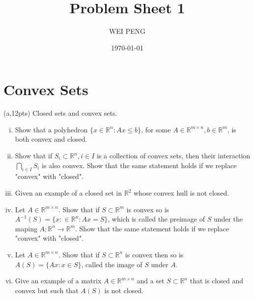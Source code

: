 \documentclass{article}     %
\title{Problem Sheet 1}  %
\author{WEI PENG}      %
\date{\today}      %
\begin{document}
\maketitle    

\section{Convex Sets}
(a,12pts) Closed sets and convex sets.
\begin{enumerate}[i.]
    \item Show that a polyhedron $\{x\in \mathbb{R}^n: Ax\leq b\}$, for some $A\in \mathbb{R}^{m\times n},b\in \mathbb{R}^m$, is both convex and closed.
    \item Show that if $S_i\subset \mathbb{R}^n,i\in I$ is a collection of convex sets, then their interaction $\bigcap_{i\in I}S_i$ is also convex. Show that the same statement holds if we replace "convex" with "closed".
    \item Given an example of a closed set in $\mathbb{R}^2$ whose convex hull is not closed.
    \item Let $A\in \mathbb{R}^{m\times n}$. Show that if $S\subset \mathbb{R}^m$ is convex so is $A^{-1}(S)=\{x:\in \mathbb{R}^{n}: Ax=S\}$, which is called the preimage of $S$ under the maping $A;\mathbb{R}^{n}\rightarrow \mathbb{R}^{m}$. Show that the same statement holds if we replace "convex" with "closed".
    \item Let $A\in \mathbb{R}^{m\times n}$. Show that if $S\subset \mathbb{R}^{n}$ is convex then so is $A(S)=\{Ax:x\in S\}$, called the image of $S$ under $A$.
    \item Give an example of a matrix $A\in \mathbb{R}^{m\times n}$ and a set $S\subset \mathbb{R}^n$ that is closed and convex but such that $A(S)$ is not closed.
\end{enumerate}
\end{document}
